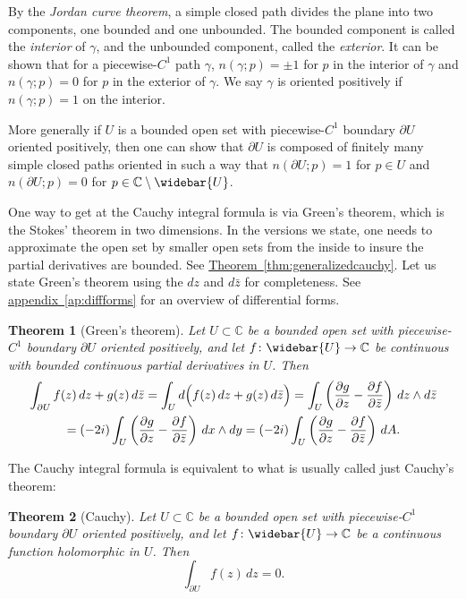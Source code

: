 \documentclass[12pt,openany]{book}
\newcommand{\C}{{\mathbb{C}}}
\newcommand{\myindex}[1]{#1\index{#1}}
\theoremstyle{plain}
\newtheorem{thm}{Theorem}[section]
\theoremstyle{remark}
\theoremstyle{definition}
\theoremstyle{exercise}
\theoremstyle{example}
\newcommand{\appendixref}[1]{\hyperref[#1]{appendix~\ref*{#1}}}
\newcommand{\thmref}[1]{\hyperref[#1]{Theorem~\ref*{#1}}}
\begin{document}
By the \emph{\myindex{Jordan curve theorem}}, a simple closed path
divides the plane into two components, one bounded and one unbounded.
The bounded component is called the \emph{\myindex{interior}} of $\gamma$,
and the unbounded component, called the \emph{\myindex{exterior}}.
It can be shown that for a piecewise-$C^1$ path $\gamma$,
$n(\gamma;p) = \pm 1$ for $p$ in the interior of
$\gamma$ and $n(\gamma;p) = 0$ for $p$ in the exterior of $\gamma$.
We say $\gamma$ is oriented positively if $n(\gamma;p) = 1$ on the interior.

More generally if $U$ is a bounded open set with piecewise-$C^1$ boundary
$\partial U$ oriented positively, then one can show that $\partial U$
is composed of finitely
many simple closed paths oriented in such a way that $n(\partial U;p) = 1$
for $p \in U$ and $n(\partial U;p) = 0$ for $p \in \C \setminus \widebar{U}$.


One way to get at the Cauchy integral formula is via Green's theorem,
which is the Stokes' theorem
in two dimensions.  In the versions we state, one needs to
approximate the open set by smaller open sets from the inside to insure
the partial derivatives are bounded.  See
\thmref{thm:generalizedcauchy}.  Let us state Green's theorem using
the $dz$ and $d\bar{z}$ for completeness.  See \appendixref{ap:diffforms}
for an overview of differential forms.

\begin{thm}[Green's theorem] \label{thm:greens}
Let $U \subset \C$ be a bounded open set with piecewise-$C^1$ boundary
$\partial U$ oriented positively, and let
$f \colon \widebar{U} \to \C$ be continuous
with bounded continuous partial derivatives in $U$.
Then
\begin{multline*}
\int_{\partial U} f(z) \, dz + g(z) \, d\bar{z}
=
\int_{U} d \Bigl( f(z) \, dz + g(z) \, d\bar{z} \Bigr)
=
\int_{U}
\left(
\frac{\partial g}{\partial z}
-
\frac{\partial f}{\partial \bar{z}}
\right)
\, dz \wedge d\bar{z}
\\
=
(-2i)
\int_{U}
\left(
\frac{\partial g}{\partial z}
-
\frac{\partial f}{\partial \bar{z}}
\right)
\, dx \wedge dy
=
(-2i)
\int_{U}
\left(
\frac{\partial g}{\partial z}
-
\frac{\partial f}{\partial \bar{z}}
\right)
\, dA.
\end{multline*}
\end{thm}

The Cauchy integral formula is equivalent to
what is usually called just Cauchy's theorem:

\begin{thm}[Cauchy]
Let $U \subset \C$ be a bounded open set with piecewise-$C^1$ boundary
$\partial U$ oriented positively, and let
$f \colon \widebar{U} \to \C$ be a continuous function
holomorphic in $U$.  Then
\begin{equation*}
\int_{\partial U}
f(z) \, dz = 0 .
\end{equation*}
\end{thm}
\end{document}
